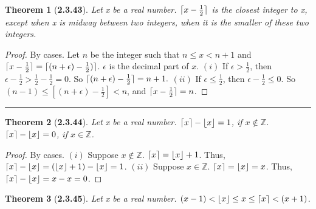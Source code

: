 \documentclass[a4paper, 12pt]{article}
\theoremstyle{plain}
\newtheorem*{theorem*}{Theorem}
\DeclarePairedDelimiter{\floor}{\lfloor}{\rfloor}
\DeclarePairedDelimiter{\ceil}{\lceil}{\rceil}
\begin{document}
\begin{theorem*}[\textbf{2.3.43}]
    Let x be a real number. $\ceil{x - \frac{1}{2}}$ is the closest integer to x, except when 
    x is midway between two integers, when it is the smaller of these two integers.
\end{theorem*}

\begin{proof}
    By cases. Let $n$ be the integer such that $n \le x < n+1$ and \newline 
    $\ceil{x - \frac{1}{2}} = \ceil{(n + \epsilon) - \frac{1}{2})}$. $\epsilon$ is the decimal 
    part of $x$.
    \newline \newline $(i)$ If $\epsilon > \frac{1}{2}$, then 
    $\epsilon - \frac{1}{2} > \frac{1}{2} - \frac{1}{2} = 0$. So 
    $\ceil{(n + \epsilon) - \frac{1}{2}} = n + 1.$ \newline \newline $(ii)$ If 
    $\epsilon \le \frac{1}{2}$, then $\epsilon - \frac{1}{2} \le 0$. So 
    $(n - 1) \le [(n + \epsilon) - \frac{1}{2}] < n$, and $\ceil{x - \frac{1}{2}} = n$.
\end{proof}
\begin{center}
    \rule{5.4in}{1pt}
\end{center}


\begin{theorem*}[\textbf{2.3.44}]
    Let x be a real number. $\ceil{x} - \floor{x} = 1$, if $x \notin \mathbb{Z}$. \newline 
    $\ceil{x} - \floor{x} = 0$, if $x \in \mathbb{Z}$. 
\end{theorem*}

\begin{proof}
    By cases. \newline \newline
    $(i)$ Suppose $x \notin \mathbb{Z}$. $\ceil{x} = \floor{x} + 1$. Thus, 
    $\ceil{x} - \floor{x} = (\floor{x} + 1) - \floor{x} = 1$. \newline \newline 
    $(ii)$ Suppose $x \in \mathbb{Z}$. $\ceil{x} = \floor{x} = x$. Thus, 
    $\ceil{x} - \floor{x} = x - x = 0$.
\end{proof}

\pagebreak


\begin{theorem*}[\textbf{2.3.45}]
    Let x be a real number. \newline $(x - 1) < \floor{x} \le x \le \ceil{x} < (x + 1)$.
\end{theorem*}
\end{document}
